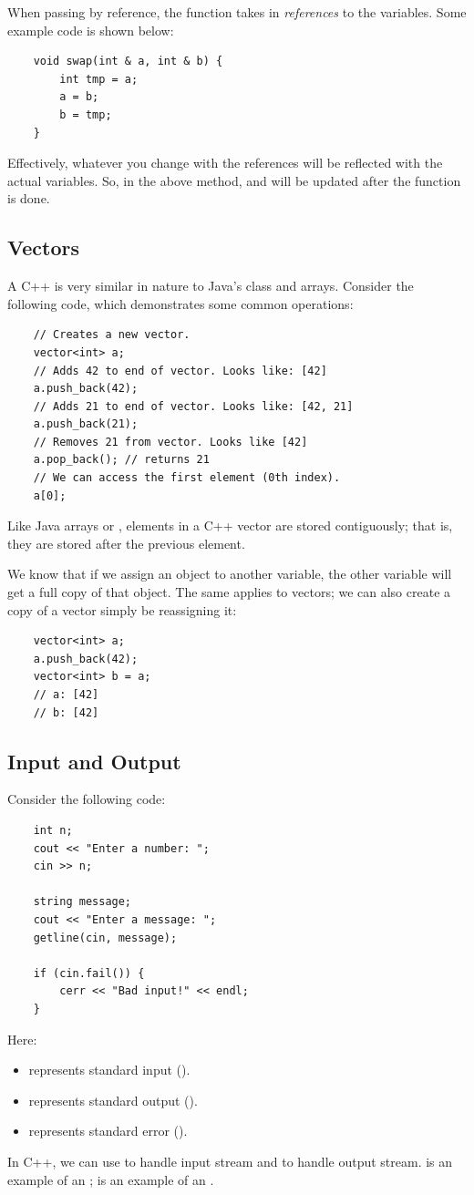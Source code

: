 \documentclass[letterpaper]{article}
\begin{document}
\bigskip 

When passing by reference, the function takes in \emph{references} to the variables. Some example code is shown below:
\begin{verbatim}
    void swap(int & a, int & b) {
        int tmp = a;
        a = b;
        b = tmp;
    }
\end{verbatim}
Effectively, whatever you change with the references will be reflected with the actual variables. So, in the above  method,  and  will be updated after the function is done. 

\subsection{Vectors}
A C++  is very similar in nature to Java's  class and arrays. Consider the following code, which demonstrates some common operations: 
\begin{verbatim}
    // Creates a new vector. 
    vector<int> a; 
    // Adds 42 to end of vector. Looks like: [42]
    a.push_back(42);
    // Adds 21 to end of vector. Looks like: [42, 21]
    a.push_back(21);
    // Removes 21 from vector. Looks like [42] 
    a.pop_back(); // returns 21 
    // We can access the first element (0th index).
    a[0];
\end{verbatim}
Like Java arrays or , elements in a C++ vector are stored contiguously; that is, they are stored after the previous element. 

\bigskip 

We know that if we assign an object to another variable, the other variable will get a full copy of that object. The same applies to vectors; we can also create a copy of a vector simply be reassigning it:
\begin{verbatim}
    vector<int> a;
    a.push_back(42);
    vector<int> b = a;
    // a: [42]
    // b: [42]
\end{verbatim}

\subsection{Input and Output}
Consider the following code: 
\begin{verbatim}
    int n; 
    cout << "Enter a number: "; 
    cin >> n; 

    string message; 
    cout << "Enter a message: "; 
    getline(cin, message);

    if (cin.fail()) {
        cerr << "Bad input!" << endl; 
    }
\end{verbatim}
Here: 
\begin{itemize}
    \item {} represents standard input (). 
    \item {} represents standard output (). 
    \item {} represents standard error ().
\end{itemize}
In C++, we can use  to handle input stream and  to handle output stream.  is an example of an ;  is an example of an . 
\end{document}
